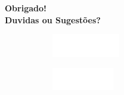 \documentclass[aspectratio=169,t,xcolor=table]{beamer}
\begin{document}
\begin{frame}
    \centering
    \vspace{2cm}
    \textbf{\Huge Obrigado!}
    \ \\
    \textbf{\Large Duvidas ou Sugestões?}
    \ \\
    \vspace{2cm}
    \begin{figure}
        \centering
        \begin{subfigure}{0.2\textwidth}
            \centering
            \includegraphics[height=1cm]{lib/logos/infw.png}
        \end{subfigure}%
        \qquad 
        \begin{subfigure}{0.2\textwidth}
            \centering
            \includegraphics[height=1cm]{lib/logos/ufgw.png}
        \end{subfigure}
    \end{figure}
\end{frame}
\end{document}
